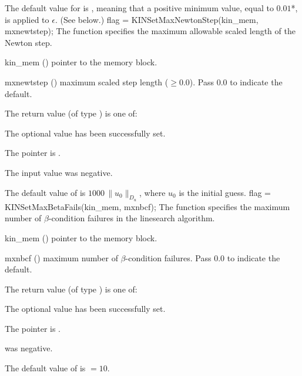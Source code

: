 {
  The default value for  is , meaning that a
  positive minimum value, equal to $0.01$*, is applied to
  $\epsilon$.  (See  below.)
}
{
flag = KINSetMaxNewtonStep(kin\_mem, mxnewtstep);
}
{
  The function  specifies the maximum allowable scaled
  length of the Newton step.
}
{
  \begin{args}[mxnewtstep]
  \item[kin\_mem] ()
    pointer to the {\kinsol} memory block.
  \item[mxnewtstep] ()
    maximum scaled step length ($\geq 0.0$).  Pass $0.0$ to indicate the default.
  \end{args}
}
{
  The return value  (of type ) is one of:
  \begin{args}
  \item[\Id{KIN\_SUCCESS}] 
    The optional value has been successfully set.
  \item[\Id{KIN\_MEM\_NULL}]
    The  pointer is .
  \item[\Id{KIN\_ILL\_INPUT}]
    The input value was negative.
  \end{args}
}
{
  The default value of  is $1000\, \| u_0 \|_{D_u}$,
  where $u_0$ is the initial guess.
}
{
flag = KINSetMaxBetaFails(kin\_mem, mxnbcf);
}
{
  The function  specifies the maximum number of
  $\beta$-condition failures in the linesearch algorithm.
}
{
  \begin{args}
  \item[kin\_mem] ()
    pointer to the {\kinsol} memory block.
  \item[mxnbcf] ()
    maximum number of $\beta$-condition failures.  Pass $0.0$ to indicate the
    default.
  \end{args}
}
{
  The return value  (of type ) is one of:
  \begin{args}
  \item[\Id{KIN\_SUCCESS}] 
    The optional value has been successfully set.
  \item[\Id{KIN\_MEM\_NULL}]
    The  pointer is .
  \item[\Id{KIN\_ILL\_INPUT}]
     was negative.
  \end{args}
}
{
  The default value of  is  $=10$.
}
